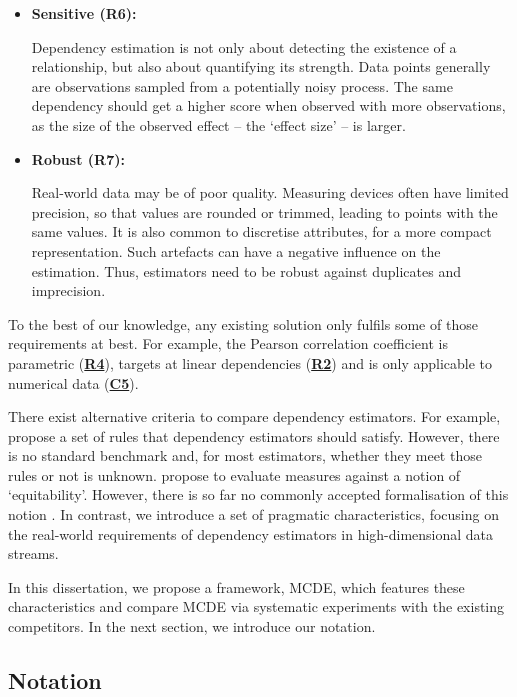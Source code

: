 \begin{itemize}[noitemsep]
	\item \hypertarget{R6}{\textbf{Sensitive (R6):}} Dependency estimation is not only about detecting the existence of a relationship, but also about quantifying its strength. Data points generally are observations sampled from a potentially noisy process. The same dependency should get a higher score when observed with more observations, as the size of the observed effect -- the `effect size' -- is larger. 
	
	\item \hypertarget{R7}{\textbf{Robust (R7):}} Real-world data may be of poor quality. Measuring devices often have limited precision, so that values are rounded or trimmed, leading to points with the same values. It is also common to discretise attributes, for a more compact representation. Such artefacts can have a negative influence on the estimation. Thus, estimators need to be robust against duplicates and imprecision. 
\end{itemize}

To the best of our knowledge, any existing solution only fulfils some of those requirements at best.
For example, the Pearson correlation coefficient is parametric (\hyperlink{R4}{\textbf{R4}}), targets at linear dependencies (\hyperlink{R2}{\textbf{R2}}) and is only applicable to numerical data (\hyperlink{C5}{\textbf{C5}}). 

There exist alternative criteria to compare dependency estimators. For example, \cite{doi:10.1007/BF02024507} propose a set of rules that dependency estimators should satisfy. However, there is no standard benchmark and, for most estimators, whether they meet those rules or not is unknown. \cite{Reshef1518} propose to evaluate measures against a notion of `equitability'. However, there is so far no commonly accepted formalisation of this notion \cite{Kinney2013, MurrellE2160}. In contrast, we introduce a set of pragmatic characteristics, focusing on the real-world requirements of dependency estimators in high-dimensional data streams.

In this dissertation, we propose a framework, \gls{MCDE}, which features these characteristics and compare \gls{MCDE} via systematic experiments with the existing competitors. In the next section, we introduce our notation. 

\subsection{Notation}
\label{sec:mcdenotations}


